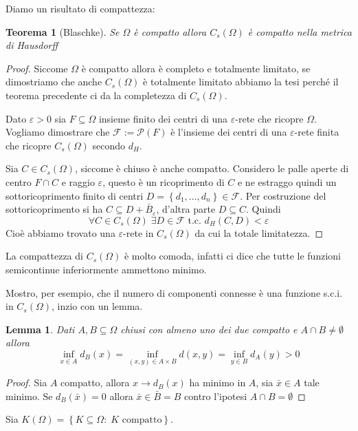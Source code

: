 \documentclass[a4paper,10pt]{article}
\newcounter{counter1}
\theoremstyle{plain}
\newtheorem{myteo}[counter1]{Teorema}
\newtheorem{mylem}[counter1]{Lemma}
\theoremstyle{definition}
\theoremstyle{remark}
\newcommand{\set}[1]{\left\{#1\right\}}
\begin{document}
Diamo un risultato di compattezza:
\begin{myteo}[Blaschke{\cite[Teorema 4.4.6]{ambrosio2000selected}}]
  Se $\Omega$ è compatto allora $C_s(\Omega)$ è compatto nella metrica
  di Hausdorff
\end{myteo}
\begin{proof}
  Siccome $\Omega$ è compatto allora è completo e totalmente limitato,
  se dimostriamo che anche $C_s(\Omega)$ è totalmente limitato abbiamo
  la tesi perché il teorema precedente ci da la completezza di
  $C_s(\Omega)$.

  Dato $\varepsilon >0$ sia $F\subseteq \Omega$ insieme finito dei centri di
  una $\varepsilon$-rete che ricopre $\Omega$. Vogliamo dimostrare che
  $\mathcal{F}:= \mathcal{P}(F)$ è l'insieme dei centri di una
  $\varepsilon$-rete finita che ricopre $C_s(\Omega)$ secondo $d_H$.

  Sia $C\in C_s(\Omega)$, siccome è chiuso è anche compatto. Considero
  le palle aperte di centro $F\cap C$ e raggio $\varepsilon$, questo è
  un ricoprimento di $C$ e ne estraggo quindi un sottoricoprimento
  finito di centri $D=\set{d_1,...,d_n} \in \mathcal{F}$. Per
  costruzione del sottoricoprimento si ha $C \subseteq D +
  \bar B_\varepsilon$, d'altra parte $D \subseteq C$. Quindi
  \[ \forall C \in C_s(\Omega)\; \exists D \in \mathcal{F}\text{ t.c. }
  d_H(C,D) < \varepsilon \]
  Cioè abbiamo trovato una $\varepsilon$-rete in $C_s(\Omega)$ da cui la
  totale limitatezza.
\end{proof}

La compattezza di $C_s(\Omega)$ è molto comoda, infatti ci dice che
tutte le funzioni semicontinue inferiormente ammettono minimo.

Mostro, per esempio, che il numero di componenti connesse è una
funzione s.c.i. in $C_s(\Omega)$, inzio con un lemma.

\begin{mylem}
  Dati $A,B \subseteq \Omega$ chiusi con almeno uno dei due compatto e
  $A \cap B \neq \emptyset$ allora
  \[ \inf _{x\in A} d_B(x) = \inf _{(x,y) \in A\times B} d(x,y) = \inf
  _{y\in B} d_A(y) >0 \]
\end{mylem}
\begin{proof}
  Sia $A$ compatto, allora $x \to d_B(x)$ ha minimo in $A$, sia $\bar
  x \in A$ tale minimo. Se $d_B(\bar x) = 0$ allora $\bar x \in \bar B = B$
  contro l'ipotesi $A \cap B = \emptyset$
\end{proof}

Sia $K(\Omega) = \set{K\subseteq \Omega :\; K \text{ compatto}}$.
\end{document}

